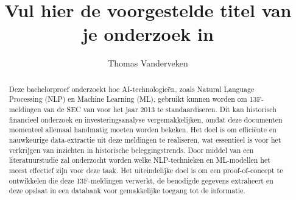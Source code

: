 \documentclass{hogent-article}
\title{Vul hier de voorgestelde titel van je onderzoek in}
\author{Thomas Vanderveken}
\begin{document}
\begin{abstract}
Deze bachelorproef onderzoekt hoe AI-technologieën, zoals Natural Language Processing (NLP) en Machine Learning (ML), gebruikt kunnen worden om 13F-meldingen van de SEC van voor het jaar 2013 te standaardiseren. Dit kan historisch financieel onderzoek en investeringsanalyse vergemakkelijken, omdat deze documenten momenteel allemaal handmatig moeten worden bekeken. Het doel is om efficiënte en nauwkeurige data-extractie uit deze meldingen te realiseren, wat essentieel is voor het verkrijgen van inzichten in historische beleggingstrends. Door middel van een literatuurstudie zal onderzocht worden welke NLP-technieken en ML-modellen het meest effectief zijn voor deze taak. Het uiteindelijke doel is om een proof-of-concept te ontwikkelen die deze 13F-meldingen verwerkt, de benodigde gegevens extraheert en deze opslaat in een databank voor gemakkelijke toegang tot de informatie.
\end{abstract}

\tableofcontents



\printbibliography[heading=bibintoc]
\end{document}
